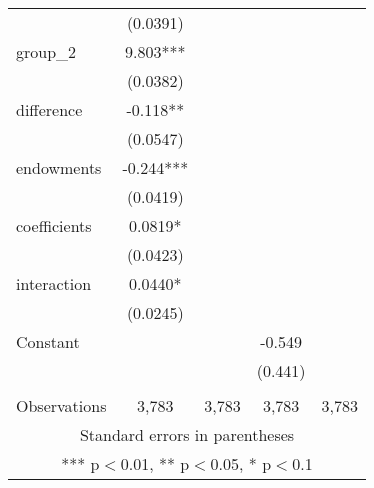 \documentclass[]{article}
\begin{document}
\begin{tabular}{lcccc}
 & (0.0391) &  &  &  \\
group\_2 & 9.803*** &  &  &  \\
 & (0.0382) &  &  &  \\
difference & -0.118** &  &  &  \\
 & (0.0547) &  &  &  \\
endowments & -0.244*** &  &  &  \\
 & (0.0419) &  &  &  \\
coefficients & 0.0819* &  &  &  \\
 & (0.0423) &  &  &  \\
interaction & 0.0440* &  &  &  \\
 & (0.0245) &  &  &  \\
Constant &  &  & -0.549 &  \\
 &  &  & (0.441) &  \\
 &  &  &  &  \\
 Observations & 3,783 & 3,783 & 3,783 & 3,783 \\ \hline
\multicolumn{5}{c}{ Standard errors in parentheses} \\
\multicolumn{5}{c}{ *** p$<$0.01, ** p$<$0.05, * p$<$0.1} \\
\end{tabular}
\end{document}
